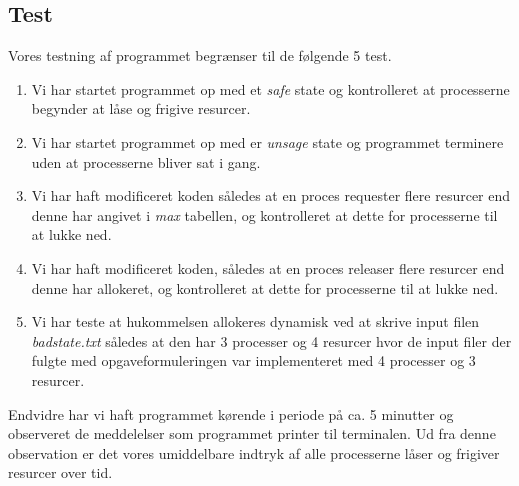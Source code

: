\documentclass[main.tex]{subfile}
\begin{document}
\subsection{Test}
Vores testning af programmet begrænser til de følgende 5 test.
\begin{enumerate}
\item Vi har startet programmet op med et \emph{safe} state og kontrolleret at processerne begynder at låse og frigive resurcer. 
\item Vi har startet programmet op med er \emph{unsage} state og programmet terminere uden at processerne bliver sat i gang. 
\item Vi har haft modificeret koden således at en proces requester flere resurcer end denne har angivet i \emph{max} tabellen, og kontrolleret at dette for processerne til at lukke ned.
\item Vi har haft modificeret koden, således at en proces releaser flere resurcer end denne har allokeret, og kontrolleret at dette for processerne til at lukke ned.
\item Vi har teste at hukommelsen allokeres dynamisk ved at skrive input filen \emph{badstate.txt} således at den har 3 processer og 4 resurcer hvor de input filer der fulgte med opgaveformuleringen var implementeret med 4 processer og 3 resurcer. 
\end{enumerate}

Endvidre har vi haft programmet kørende i periode på ca. 5 minutter og observeret de meddelelser som programmet printer til terminalen. Ud fra denne observation er det vores umiddelbare indtryk af alle processerne låser og frigiver resurcer over tid.\\
\end{document}
